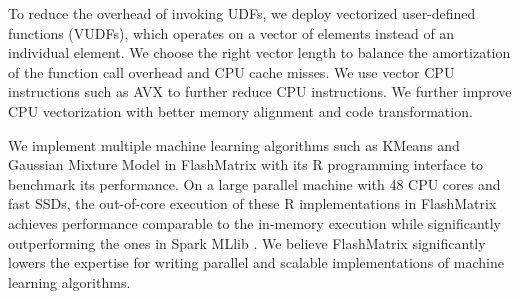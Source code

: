 To reduce the overhead of invoking UDFs, we deploy vectorized user-defined
functions (VUDFs), which operates on a vector of elements instead of
an individual element. We choose the right vector length to balance
the amortization of the function call overhead and CPU cache misses. We use
vector CPU instructions such as AVX \cite{avx} to further reduce CPU
instructions. We further improve CPU vectorization with better memory alignment
and code transformation.


We implement multiple machine learning algorithms such as KMeans \cite{kmeans}
and Gaussian Mixture Model \cite{gmm} in FlashMatrix with its R programming
interface to benchmark its performance. On a large parallel machine with 48
CPU cores and fast SSDs, the out-of-core execution of these R implementations
in FlashMatrix achieves performance comparable to the in-memory execution
while significantly outperforming the ones in Spark MLlib \cite{spark}.
We believe FlashMatrix significantly lowers the expertise for writing parallel
and scalable implementations of machine learning algorithms.
